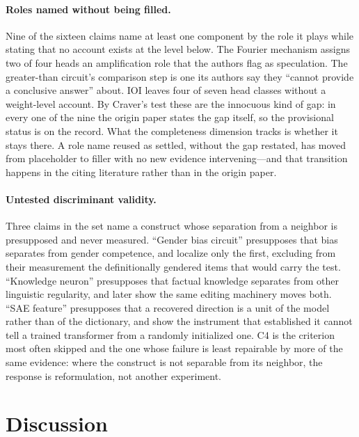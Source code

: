 \documentclass{article}
\begin{document}
\paragraph{Roles named without being filled.} Nine of the sixteen claims name at least one component by the role it plays while stating that no account exists at the level below. The Fourier mechanism assigns two of four heads an amplification role that the authors flag as speculation. The greater-than circuit's comparison step is one its authors say they ``cannot provide a conclusive answer'' about. IOI leaves four of seven head classes without a weight-level account. By Craver's test these are the innocuous kind of gap: in every one of the nine the origin paper states the gap itself, so the provisional status is on the record. What the completeness dimension tracks is whether it stays there. A role name reused as settled, without the gap restated, has moved from placeholder to filler with no new evidence intervening---and that transition happens in the citing literature rather than in the origin paper.

\paragraph{Untested discriminant validity.} Three claims in the set name a construct whose separation from a neighbor is presupposed and never measured. ``Gender bias circuit'' presupposes that bias separates from gender competence, and \citet{vig2020gender} localize only the first, excluding from their measurement the definitionally gendered items that would carry the test. ``Knowledge neuron'' presupposes that factual knowledge separates from other linguistic regularity, and \citet{niu2024knowledge} later show the same editing machinery moves both. ``SAE feature'' presupposes that a recovered direction is a unit of the model rather than of the dictionary, and \citet{heap2025sparse} show the instrument that established it cannot tell a trained transformer from a randomly initialized one. C4 is the criterion most often skipped and the one whose failure is least repairable by more of the same evidence: where the construct is not separable from its neighbor, the response is reformulation, not another experiment.

\section{Discussion}
\label{sec:discussion}
\end{document}
